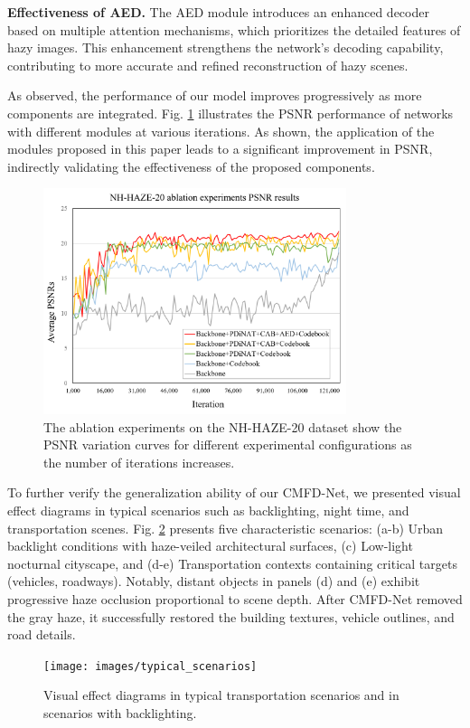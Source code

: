 \documentclass[journal]{IEEEtran}
\begin{document}
	{\bf{Effectiveness of AED.}} The AED module introduces an enhanced decoder based on multiple attention mechanisms, which prioritizes the detailed features of hazy images. This enhancement strengthens the network’s decoding capability, contributing to more accurate and refined reconstruction of hazy scenes.

As observed, the performance of our model improves progressively as more components are integrated. Fig. \ref{Ablation_study_2} illustrates the PSNR performance of networks with different modules at various iterations. As shown, the application of the modules proposed in this paper leads to a significant improvement in PSNR, indirectly validating the effectiveness of the proposed components.

\begin{figure}[!t]
	\centering
	\includegraphics[width=3.49in]{images/ablation_experiments}
	\caption{The ablation experiments on the NH-HAZE-20 dataset show the PSNR variation curves for different experimental configurations as the number of iterations increases.}
	\label{Ablation_study_2}
\end{figure}

To further verify the generalization ability of our CMFD-Net, we presented visual effect diagrams in typical scenarios such as backlighting, night time, and transportation scenes. Fig. \ref{typical_scenarios} presents five characteristic scenarios: (a-b) Urban backlight conditions with haze-veiled architectural surfaces, (c) Low-light nocturnal cityscape, and (d-e) Transportation contexts containing critical targets (vehicles, roadways). Notably, distant objects in panels (d) and (e) exhibit progressive haze occlusion proportional to scene depth. After CMFD-Net removed the gray haze, it successfully restored the building textures, vehicle outlines, and road details.

\begin{figure}[!t]
	\centering
	\texttt{[image: images/typical\_scenarios]}
	\caption{Visual effect diagrams in typical transportation scenarios and in scenarios with backlighting.}
	\label{typical_scenarios}
\end{figure}
\end{document}
